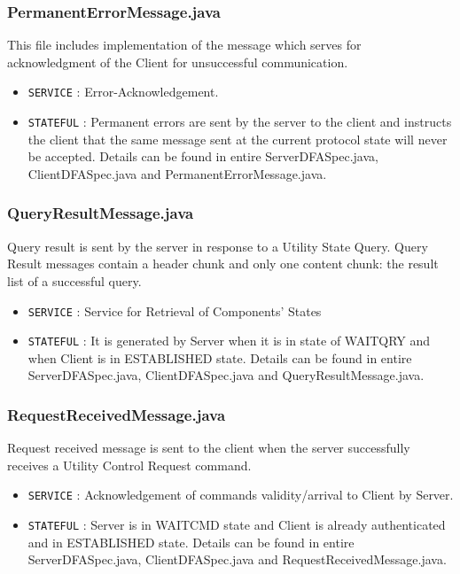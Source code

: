 \documentclass[12pt]{usenixsubmit}
\begin{document}
     \subsubsection{PermanentErrorMessage.java}This file includes implementation of the message which serves for acknowledgment of the Client for unsuccessful communication.
     \begin{itemize}
     \item {\tt SERVICE} : Error-Acknowledgement.
     \item {\tt STATEFUL} : Permanent errors are sent by the server to the client and instructs the client that the same message sent at the current protocol state will never be accepted. Details can be found in entire ServerDFASpec.java, ClientDFASpec.java and PermanentErrorMessage.java.
     \end{itemize}

     \subsubsection{QueryResultMessage.java}Query result is sent by the server in response to a Utility State Query. Query Result messages contain a header chunk and only one content chunk: the result list of a successful query.
     \begin{itemize}
     \item {\tt SERVICE} : Service for Retrieval of Components' States  
     \item {\tt STATEFUL} : It is generated by Server when it is in state of WAITQRY and when Client is in ESTABLISHED state. Details can be found in entire ServerDFASpec.java, ClientDFASpec.java and QueryResultMessage.java.
     \end{itemize}

     \subsubsection{RequestReceivedMessage.java}Request received message is sent to the client when the server successfully receives a Utility Control Request command.
     \begin{itemize}
     \item {\tt SERVICE} : Acknowledgement of commands validity/arrival to Client by Server.
     \item {\tt STATEFUL} : Server is in WAITCMD state and Client is already authenticated and in ESTABLISHED state. Details can be found in entire ServerDFASpec.java, ClientDFASpec.java and RequestReceivedMessage.java.
     \end{itemize}
\end{document}
